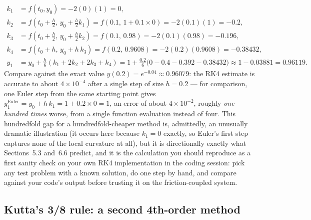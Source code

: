 \begin{align}
k_1 &= f(t_0, y_0) = -2(0)(1) = 0,\\
k_2 &= f\!\left(t_0+\tfrac{h}{2},\, y_0+\tfrac{h}{2}k_1\right) = f(0.1,\, 1 + 0.1\times 0) = -2(0.1)(1) = -0.2,\\
k_3 &= f\!\left(t_0+\tfrac{h}{2},\, y_0+\tfrac{h}{2}k_2\right) = f(0.1,\,0.98) = -2(0.1)(0.98) = -0.196,\\
k_4 &= f\!\left(t_0+h,\, y_0+h\,k_3\right) = f(0.2,\,0.9608) = -2(0.2)(0.9608) = -0.38432,\\
y_1 &= y_0 + \frac{h}{6}\left(k_1+2k_2+2k_3+k_4\right) = 1 + \frac{0.2}{6}\big(0 - 0.4 - 0.392 - 0.38432\big) \approx 1 - 0.03881 = 0.96119.
\end{align}
Compare against the exact value $y(0.2) = e^{-0.04} \approx 0.96079$: the RK4 estimate is accurate to about $4\times 10^{-4}$ after a single step of size $h=0.2$ --- for comparison, one Euler step from the same starting point gives $y_1^{\mathrm{Euler}} = y_0 + h\,k_1 = 1 + 0.2\times 0 = 1$, an error of about $4\times 10^{-2}$, roughly \emph{one hundred times} worse, from a single function evaluation instead of four. This hundredfold gap for a hundredfold-cheaper method is, admittedly, an unusually dramatic illustration (it occurs here because $k_1=0$ exactly, so Euler's first step captures none of the local curvature at all), but it is directionally exactly what Sections~5.3 and~6.6 predict, and it is the calculation you should reproduce as a first sanity check on your own RK4 implementation in the coding session: pick any test problem with a known solution, do one step by hand, and compare against your code's output before trusting it on the friction-coupled system.

\subsection{Kutta's 3/8 rule: a second 4th-order method}

